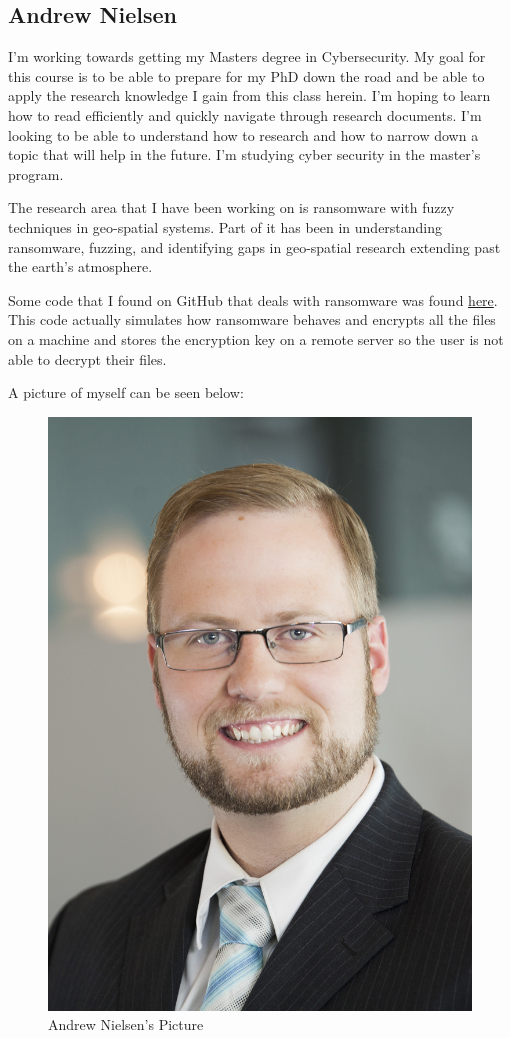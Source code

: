 \subsection{Andrew Nielsen}

I'm working towards getting my Masters degree in Cybersecurity. My goal for this course is to be able to prepare for my PhD down the road and be able to apply the research knowledge I gain from this class herein. I'm hoping to learn how to read efficiently and quickly navigate through research documents. I'm looking to be able to understand how to research and how to narrow down a topic that will help in the future. I'm studying cyber security in the master's program. 

The research area that I have been working on is ransomware with fuzzy techniques in geo-spatial systems. Part of it has been in understanding ransomware, fuzzing, and identifying gaps in geo-spatial research extending past the earth's atmosphere.

Some code that I found on GitHub that deals with ransomware was found \href{https://github.com/mauri870/ransomware.git}{here}. This code actually simulates how ransomware behaves and encrypts all the files on a machine and stores the encryption key on a remote server so the user is not able to decrypt their files. 


A picture of myself can be seen below:

\begin{figure}[htp]\centering
\includegraphics[width=.3\textwidth]{Andrew Professional picture.jpg}
\caption{Andrew Nielsen's Picture}
\label{fig:Andrew Professional picture}
\end{figure}

